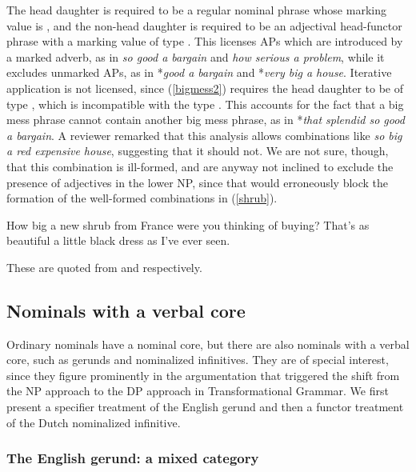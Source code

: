\documentclass[output=paper]{langsci/langscibook}
\begin{document}
\noindent
The head daughter is required to be a regular nominal phrase 
whose {\sc marking} value is , and the non-head daughter 
is required to be an adjectival head-functor phrase
with a {\sc marking} value of type . 
This licenses APs which are introduced by a marked adverb, 
as in \emph{so good a bargain} and \emph{how serious a problem}, 
while it excludes unmarked APs, as in 
*\emph{good a bargain} and *\emph{very big a house}.
Iterative application is not licensed, since (\ref{bigmess2}) requires the 
head daughter to be of type , which is incompatible with the type 
. This accounts for the fact that a big
mess phrase cannot contain another big mess phrase, as in
*\emph{that splendid so good a bargain}.
A reviewer remarked that this analysis allows combinations like 
\emph{so big a red expensive house}, suggesting that it should not. 
We are not sure, though, that this combination is ill-formed, 
and are anyway not inclined to exclude the presence of adjectives in 
the lower NP, since that would erroneously block the formation of the 
well-formed combinations in (\ref{shrub}).

\begin{exe} 
\ex\label{shrub} 
\begin{xlist} 
\ex  How big a new shrub from France were you thinking of buying? 
\ex  That's as beautiful a little black dress as I've ever seen.  
\end{xlist} 
\end{exe} 

\noindent
These are quoted from \citet[116]{Zwicky95} and \citet[42]{Troseth09} respectively. 


\subsection{Nominals with a verbal core} 


Ordinary nominals have a nominal core, but there are also nominals  
with a verbal core, such as gerunds and nominalized infinitives. They are 
of special interest, since they figure prominently in the argumentation 
that triggered the shift from the NP approach to the DP approach in Transformational 
Grammar. We first present a specifier treatment of the English gerund and then 
a functor treatment of the Dutch nominalized infinitive. 


\subsubsection{The English gerund: a mixed category} 
\end{document}
